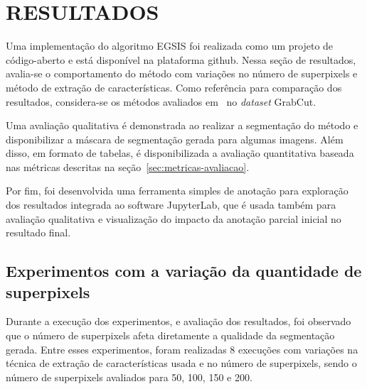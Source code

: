 \chapter{RESULTADOS}\label{chap:resultados}

Uma implementação do algoritmo EGSIS foi realizada como um projeto de
código-aberto e está disponível na plataforma
github\footnotemark. Nessa seção de resultados, avalia-se o
comportamento do método com variações no número de superpixels e
método de extração de características. Como referência para comparação
dos resultados, considera-se os métodos avaliados
em~\cite{wang2023review} no \textit{dataset} GrabCut.


Uma avaliação qualitativa é demonstrada ao realizar a segmentação do
método e disponibilizar a máscara de segmentação gerada para algumas
imagens. Além disso, em formato de tabelas, é disponibilizada a
avaliação quantitativa baseada nas métricas descritas na
seção~\ref{sec:metricas-avaliacao}.

Por fim, foi desenvolvida uma ferramenta simples de anotação para
exploração dos resultados integrada ao software
JupyterLab\footnotemark, que é usada também para avaliação qualitativa
e visualização do impacto da anotação parcial inicial no resultado
final.


\section{Experimentos com a variação da quantidade de superpixels}\label{sec:variacao-superpixels}

Durante a execução dos experimentos, e avaliação dos resultados, foi
observado que o número de superpixels afeta diretamente a qualidade da
segmentação gerada. Entre esses experimentos, foram realizadas 8
execuções com variações na técnica de extração de características
usada e no número de superpixels, sendo o número de superpixels
avaliados para 50, 100, 150 e 200.

